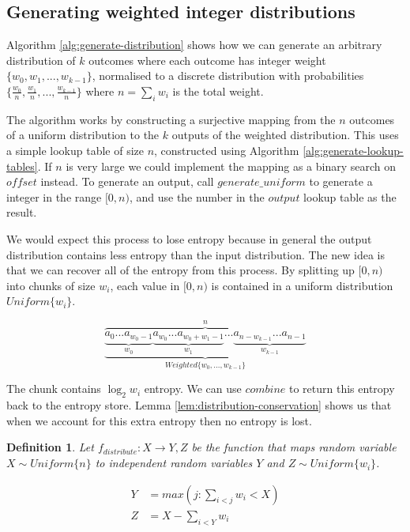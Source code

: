 \documentclass[12pt]{article}
\newtheorem{definition}{Definition}
\begin{document}
\subsection{Generating weighted integer distributions}

Algorithm \ref{alg:generate-distribution} shows how we can generate an arbitrary  distribution of $k$ outcomes where each outcome has integer weight $\{w_0, w_1, ..., w_{k-1}\}$, normalised to a discrete distribution with probabilities $\{\frac{w_0}{n}, \frac{w_1}{n}, ..., \frac{w_{k-1}}{n}\}$ where $n=\sum_i w_i$ is the total weight.

The algorithm works by constructing a surjective mapping from the $n$ outcomes of a uniform distribution to the $k$ outputs of the weighted distribution. This uses a simple lookup table of size $n$, constructed using Algorithm \ref{alg:generate-lookup-tables}. If $n$ is very large we could implement the mapping as a binary search on $offset$ instead. To generate an output, call $generate\_uniform$ to generate a integer in the range $[0,n)$, and use the number in the $output$ lookup table as the result. 

We would expect this process to lose entropy because in general the output distribution contains less entropy than the input distribution. The new idea is that we can recover all of the entropy from this process. By splitting up $[0,n)$ into chunks of size $w_i$, each value in $[0,n)$ is contained in a uniform distribution $Uniform\{w_i\}$.

\[
\overbrace{
    \underbrace{
        \underbrace{a_0 ... a_{w_0-1}}_{w_0}
          \underbrace{a_{w_0} ... a_{w_0+w_1-1}}_{w_1}
          ...
          \underbrace{
             a_{n-w_{k-1}} ... 
             a_{n-1}
         }_{w_{k-1}}
    }_{Weighted\{w_0, ..., w_{k-1}\}}
}^{n}
\]

The chunk contains $\log_2w_i$ entropy. We can use $combine$ to return this entropy back to the entropy store. Lemma \ref{lem:distribution-conservation} shows us that when we account for this extra entropy then no entropy is lost.



\begin{definition}
    Let $f_{distribute}: X \rightarrow Y, Z$ be the function that maps random variable $X \sim Uniform\{n\}$ to independent random variables $Y$ and $Z \sim Uniform\{w_i\}$.

    \begin{align}
    Y &= max(j : \sum_{i<j}w_i<X) \\
    Z &= X - \sum_{i<Y}w_i
    \end{align}

\end{definition}
\end{document}

